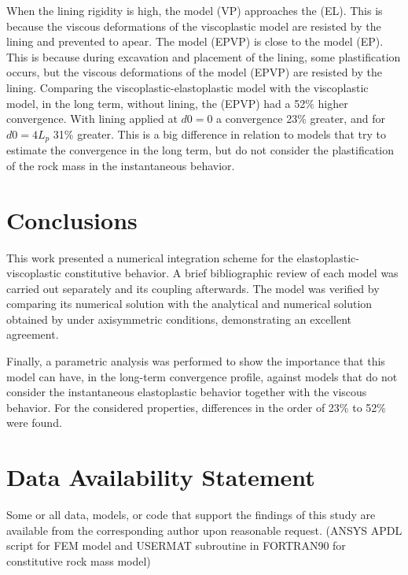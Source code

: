 \documentclass[Journal,letterpaper]{ascelike-new}
\begin{document}
When the lining rigidity is high, the model (VP) approaches the (EL). This is because the viscous deformations of the viscoplastic model are resisted by the lining and prevented to apear. The model (EPVP) is close to the model (EP). This is because during excavation and placement of the lining, some plastification occurs, but the viscous deformations of the model (EPVP) are resisted by the lining. Comparing the viscoplastic-elastoplastic model with the viscoplastic model, in the long term, without lining, the (EPVP) had a 52\% higher convergence. With lining applied at $d0=0$ a convergence 23\% greater, and for $d0=4L_p$ 31\% greater. This is a big difference in relation to models that try to estimate the convergence in the long term, but do not consider the plastification of the rock mass in the instantaneous behavior.

\section{Conclusions}

This work presented a numerical integration scheme for the elastoplastic-viscoplastic constitutive behavior. A brief bibliographic review of each model was carried out separately and its coupling afterwards. The model was verified by comparing its numerical solution with the analytical and numerical solution obtained by  under axisymmetric conditions, demonstrating an excellent agreement.

Finally, a parametric analysis was performed to show the importance that this model can have, in the long-term convergence profile, against models that do not consider the instantaneous elastoplastic behavior together with the viscous behavior. For the considered properties, differences in the order of 23\% to 52\% were found.

\section{Data Availability Statement}

Some or all data, models, or code that support the findings of this study are available from the corresponding author upon reasonable request. (ANSYS APDL script for FEM model and USERMAT subroutine in FORTRAN90 for constitutive rock mass model)

\pagebreak
%
%
%
%
%
%
%

%
\end{document}
